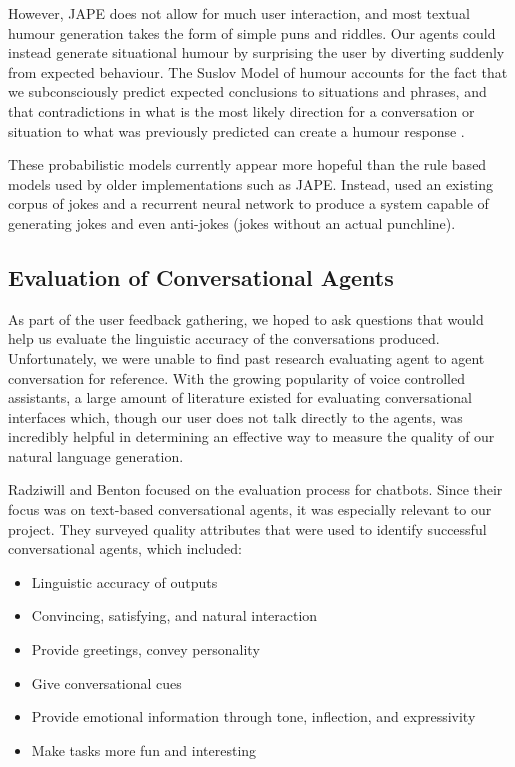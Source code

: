 \documentclass{article}
\begin{document}
However, JAPE does not allow for much user interaction, and most textual humour generation takes the form of simple puns and riddles. Our agents could instead generate situational humour by surprising the user by diverting suddenly from expected behaviour. The Suslov Model of humour accounts for the fact that we subconsciously predict expected conclusions to situations and phrases, and that contradictions in what is the most likely direction for a conversation or situation to what was previously predicted can create a humour response \cite{suslov}.

These probabilistic models currently appear more hopeful than the rule based models used by older implementations such as JAPE. Instead, \cite{humourrnn} used an existing corpus of jokes and a recurrent neural network to produce a system capable of generating jokes and even anti-jokes (jokes without an actual punchline). 

\subsection{Evaluation of Conversational Agents}

As part of the user feedback gathering, we hoped to ask questions that would help us evaluate the linguistic accuracy of the conversations produced. Unfortunately, we were unable to find past research evaluating agent to agent conversation for reference. With the growing popularity of voice controlled assistants, a large amount of literature existed for evaluating conversational interfaces which, though our user does not talk directly to the agents, was incredibly helpful in determining an effective way to measure the quality of our natural language generation. 

Radziwill and Benton \cite{conveval} focused on the evaluation process for chatbots. Since their focus was on text-based conversational agents, it was especially relevant to our project. They surveyed quality attributes that were used to identify successful conversational agents, which included:
\begin{itemize}
	\item Linguistic accuracy of outputs
	\item Convincing, satisfying, and natural interaction
	\item Provide greetings, convey personality
	\item Give conversational cues
	\item Provide emotional information through tone, inflection, and expressivity
	\item Make tasks more fun and interesting
\end{itemize} 
\end{document}
